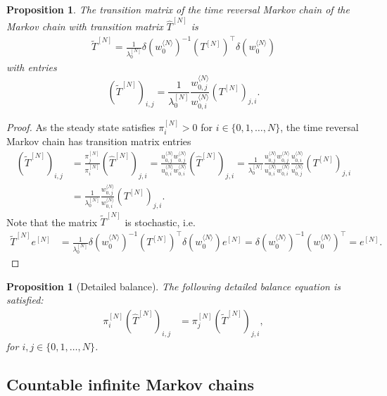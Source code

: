\documentclass[11pt]{amsart}
\theoremstyle{plain}
\newtheorem{pro}[teo]{Proposition}
\newcommand{\1}{\text{\fontseries{bx}\selectfont \textup 1}}
\begin{document}
\begin{pro}
	The transition matrix of the time reversal Markov chain of the Markov chain with transition matrix $\hat T^{[N]}$ is
	\begin{align*}
		\tilde T^{[N]}= \frac{1}{\lambda^{[N]}_0}\delta(w_0^{\langle N\rangle})^{-1}(T^{[N]})^\top \delta(w_0^{\langle N\rangle})
	\end{align*}
	with entries
	\[
	(\tilde T^{[N]})_{i,j}= \frac{1}{\lambda^{[N]}_0}
	\frac{w^{{\langle N\rangle}}_{0,j}}{w^{{\langle N\rangle}}_{0,i}}(T^{[N]})_{j,i}.
	\]
\end{pro}

\begin{proof}
	As the steady state satisfies $\pi^{[N]}_i>0$ for $i\in\{0,1,\dots,N\}$, the time reversal Markov chain has transition matrix entries
	\begin{align*}
		(\tilde T^{[N]})_{i,j}&=\frac{\pi^{[N]}_j}{\pi^{[N]}_i}(\hat T^{[N]})_{j,i}=\frac{u^{\langle N\rangle}_{0,j}w^{{\langle N\rangle}}_{0,j}}{u^{\langle N\rangle}_{0,i}w^{{\langle N\rangle}}_{0,i}}(\hat T^{[N]})_{j,i}= \frac{1}{\lambda^{[N]}_0}
		\frac{u^{\langle N\rangle}_{0,j}w^{{\langle N\rangle}}_{0,j}}{u^{\langle N\rangle}_{0,i}w^{{\langle N\rangle}}_{0,i}}\frac{u^{\langle N\rangle}_{0,i}}{u^{\langle N\rangle}_{0,j}}(T^{[N]})_{j,i}\\
		&= \frac{1}{\lambda^{[N]}_0}
		\frac{w^{{\langle N\rangle}}_{0,j}}{w^{{\langle N\rangle}}_{0,i}}(T^{[N]})_{j,i}.
	\end{align*}
	Note that the matrix $\tilde T^{[N]}$ is stochastic, i.e.
	\[
	\begin{aligned}
		\tilde T^{[N]}e^{[N]}&= \frac{1}{\lambda^{[N]}_0}\delta(w_0^{\langle N\rangle})^{-1}(T^{[N]})^\top \delta(w_0^{\langle N\rangle})e^{[N]}
		=\delta(w_0^{\langle N\rangle})^{-1}(w_0^{\langle N\rangle})^\top=e^{[N]}.
	\end{aligned}
	\]
\end{proof}



\begin{pro}[Detailed balance]
	The following detailed balance equation is satisfied:
	\begin{align}\label{eq:detalied_balance}
		\pi^{[N]}_i (\hat T^{[N]})_{i,j} &= \pi^{[N]}_j (\tilde T^{[N]})_{j,i},
	\end{align}
	for $i,j\in\{0,1,\dots,N\}$.
\end{pro}

\subsection{Countable infinite Markov chains}
\end{document}

